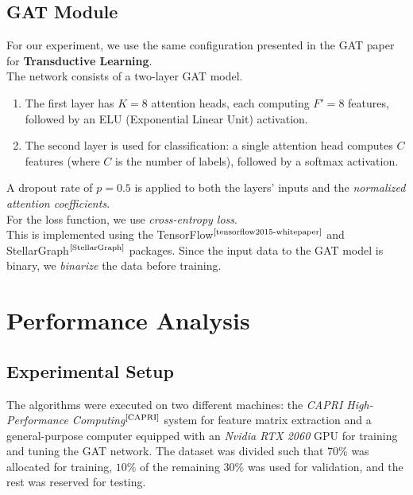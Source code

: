 \documentclass[12pt,conference]{ieeeconf} %
\begin{document}
\subsection{GAT Module}
For our experiment, we use the same configuration presented in the GAT paper for \textbf{Transductive Learning}. \\
The network consists of a two-layer GAT model. 
\begin{enumerate}
    \item The first layer has $K = 8$ attention heads, each computing $F' = 8$ features, followed by an ELU (Exponential Linear Unit) activation.
    \item The second layer is used for classification: a single attention head computes $C$ features (where $C$ is the number of labels), followed by a softmax activation.
\end{enumerate}
A dropout rate of $p = 0.5$ is applied to both the layers' inputs and the \textit{normalized attention coefficients}.\\
For the loss function, we use \textit{cross-entropy loss}. \\This is implemented using the TensorFlow$^{\text{\cite{tensorflow2015-whitepaper}}}$ and StellarGraph$^{\text{\cite{StellarGraph}}}$ packages.
Since the input data to the GAT model is binary, we \textit{binarize} the data before training.

\section{Performance Analysis} 
\subsection{Experimental Setup}
The algorithms were executed on two different machines: the \textit{CAPRI High-Performance Computing}$^{\text{\cite{CAPRI}}}$ system for feature matrix extraction and a general-purpose computer equipped with an \textit{Nvidia RTX 2060} GPU for training and tuning the GAT network. The dataset was divided such that $70\%$ was allocated for training, $10\%$ of the remaining $30\%$ was used for validation, and the rest was reserved for testing.
\end{document}
